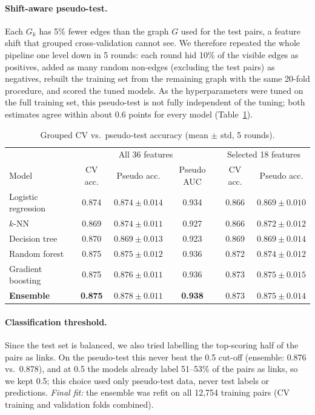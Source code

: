 \documentclass[runningheads]{llncs}
\begin{document}
\paragraph{Shift-aware pseudo-test.} Each $G_k$ has 5\% fewer edges than the graph $G$ used for the test pairs, a feature shift that grouped cross-validation cannot see. We therefore repeated the whole pipeline one level down in 5 rounds: each round hid 10\% of the visible edges as positives, added as many random non-edges (excluding the test pairs) as negatives, rebuilt the training set from the remaining graph with the same 20-fold procedure, and scored the tuned models. As the hyperparameters were tuned on the full training set, this pseudo-test is not fully independent of the tuning; both estimates agree within about 0.6 points for every model (Table~\ref{tab:model-results}).

\begin{table}[t]
\centering
\small
\caption{Grouped CV vs.\ pseudo-test accuracy (mean $\pm$ std, 5 rounds).}
\label{tab:model-results}
\begin{tabular}{lccc|cc}
\hline
 & \multicolumn{3}{c|}{All 36 features} & \multicolumn{2}{c}{Selected 18 features} \\
Model & CV acc. & Pseudo acc. & Pseudo AUC & CV acc. & Pseudo acc. \\
\hline
Logistic regression & 0.874 & $0.874 \pm 0.014$ & 0.934 & 0.866 & $0.869 \pm 0.010$ \\
$k$-NN              & 0.869 & $0.874 \pm 0.011$ & 0.927 & 0.866 & $0.872 \pm 0.012$ \\
Decision tree       & 0.870 & $0.869 \pm 0.013$ & 0.923 & 0.869 & $0.869 \pm 0.014$ \\
Random forest       & 0.875 & $0.875 \pm 0.012$ & 0.936 & 0.872 & $0.874 \pm 0.012$ \\
Gradient boosting   & 0.875 & $0.876 \pm 0.011$ & 0.936 & 0.873 & $0.875 \pm 0.015$ \\
\textbf{Ensemble}   & \textbf{0.875} & $\mathbf{0.878 \pm 0.011}$ & \textbf{0.938} & 0.873 & $0.875 \pm 0.014$ \\
\hline
\end{tabular}
\end{table}

\paragraph{Classification threshold.} Since the test set is balanced, we also tried labelling the top-scoring half of the pairs as links. On the pseudo-test this never beat the 0.5 cut-off (ensemble: 0.876 vs.\ 0.878), and at 0.5 the models already label 51--53\% of the pairs as links, so we kept 0.5; this choice used only pseudo-test data, never test labels or predictions. \emph{Final fit:} the ensemble was refit on all 12{,}754 training pairs (CV training and validation folds combined).
\end{document}
